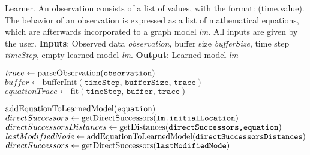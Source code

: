 \documentclass{article}
\newcommand{\vars}{\texttt}
\newcommand{\func}{\textrm}
\begin{document}
		
	\begin{algorithm}
		\caption{Learner. An observation consists of a list of values, with the format: (time,value). The behavior of an observation is expressed as a list of mathematical equations, which are afterwards incorporated to a graph model \textit{lm}.  All inputs are given by the user. 
		\newline \textbf{Inputs}: Observed data \textit{observation}, buffer size \textit{bufferSize}, time step \textit{timeStep}, empty learned model \textit{lm}.
		\newline \textbf{Output}: Learned model \textit{lm}}
		\label{learner}
		\begin{algorithmic}[1]
			
			\State $trace \gets \func{parseObservation(\vars{observation})}$
			\State $buffer \gets \func{bufferInit}(\vars{timeStep, bufferSize, trace})$
			\State $equationTrace \gets \func{fit} (\vars{timeStep, buffer, trace})$
			
					\State $\func{addEquationToLearnedModel(\vars{equation})}$
				\EndFor
			\Else
				\State $directSuccessors \gets \func{getDirectSuccessors(\vars{lm.initialLocation})}$
					\State $directSuccessorsDistances \gets \func{getDistances(\vars{directSuccessors,equation})}$
					\State $lastModifiedNode \gets \func{addEquationToLearnedModel(\vars{directSuccessorsDistances})}$
					\State $directSuccessors\gets \func{getDirectSuccessors(\vars{lastModifiedNode})}$
				\EndFor
			\EndIf
			\EndProcedure
		\end{algorithmic}
	\end{algorithm}
\end{document}
